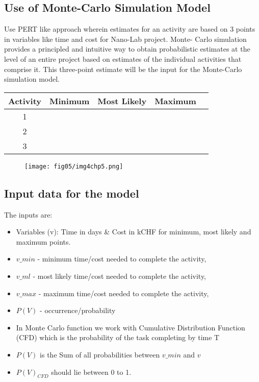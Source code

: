 \subsection{Use of Monte-Carlo Simulation Model}


Use PERT like approach wherein estimates for an activity are based on 3 points in variables like time and cost for Nano-Lab project. Monte- Carlo simulation provides a principled and intuitive way to obtain probabilistic estimates at the level of an entire project based on estimates of the individual activities that comprise it. This three-point estimate will be the input for the Monte-Carlo simulation model. 



\begin{center}
	\begin{tabular}{ |c|c|c|c| c|} 
		\hline
		Activity & Minimum & Most Likely & Maximum\\
		\hline
		1 & &  & \\ 
			\hline
		2 & & &\\ 
			\hline
		3& & &\\ 
		\hline
	\end{tabular}
\end{center}

\begin{figure}
	\centering
	\texttt{[image: fig05/img4chp5.png]}
\end{figure}

\subsection{Input data for the model} \label{5.3.2}
	
The inputs are:
\begin{itemize}
	\item Variables (v): Time in days \& Cost in kCHF for minimum, most likely and maximum points.
	\item $v\_min$ - minimum time/cost needed to complete the activity,
	\item $v\_ml$ - most likely time/cost needed to complete the activity,
	\item $v\_max$ - maximum time/cost needed to complete the activity, 
	\item $P(V)$ - occurrence/probability
	\item In Monte Carlo function we work with Cumulative Distribution Function (CFD) which is the probability of the task completing by time T
	\item $P(V)$ is the Sum of all probabilities between $v\_min$ and $v$
	\item $P(V)_{CFD}$ should lie between 0 to 1.
\end{itemize}
     
